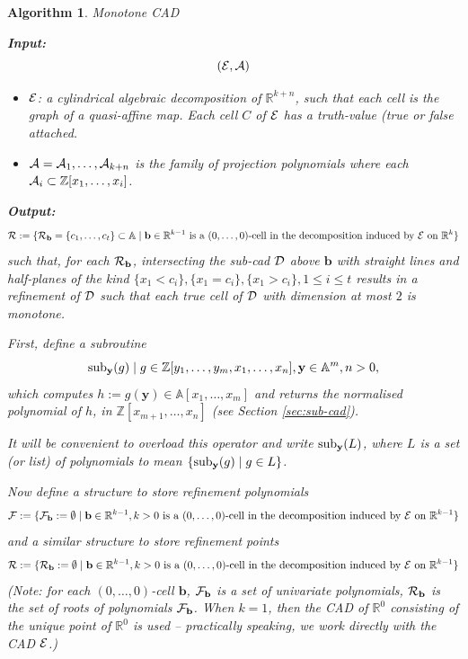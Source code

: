 \documentclass[
]{book}
\newtheorem{algorithm}{Algorithm}
\theoremstyle{definition}
\theoremstyle{definition}
\theoremstyle{definition}
\theoremstyle{definition}
\theoremstyle{remark}
\begin{document}
\begin{algorithm}Monotone CAD

\textbf{Input:}
\[({\cal E}, {\cal A})\]

\begin{itemize}
\item
  \(\cal E\): a cylindrical algebraic decomposition of \(\mathbb{R}^{k+n}\), such that each cell is the graph of a quasi-affine map. Each cell \(C\) of \(\cal E\) has a truth-value (\emph{true} or \emph{false} attached.
\item
  \({\cal A} = {\cal A}_1,\ldots,{\cal A}_{k+n}\) is the family of projection polynomials where each \({\cal A}_i \subset \mathbb{Z}[x_1,\ldots,x_i]\).
\end{itemize}

\textbf{Output:}
\[
{\cal R} := \{ {\cal R}_{\mathbf{b}} = \{ c_1,\ldots,c_t \} \subset \mathbb{A}\mid \mathbf{b} \in \mathbb{R}^{k-1} \text{ is a } (0,\ldots,0) \text{-cell in the decomposition induced by } {\cal E} \text{ on } \mathbb{R}^k \}
\]
such that, for each \({\cal R}_\mathbf{b}\), intersecting the sub-cad \(\cal D\) above \(\mathbf{b}\) with straight lines and half-planes of the kind \(\{x_1 < c_i \}, \{x_1 = c_i \}, \{x_1 > c_i\}, 1 \le i \le t\) results in a refinement of \(\cal D\) such that each true cell of \(\cal D\) with dimension at most \(2\) is monotone.

First, define a subroutine
\[{\rm sub}_{\mathbf{y}} (g) \mid g \in \mathbb{Z}[y_1,\ldots,y_m,x_1,\ldots,x_n], \mathbf{y} \in \mathbb{A}^m, n > 0,\]
which computes \(h := g(\mathbf{y}) \in \mathbb{A}[x_{1},\ldots,x_m]\) and returns the normalised polynomial of \(h\), in \(\mathbb{Z}[x_{m+1},\ldots,x_n]\) (see Section \ref{sec:sub-cad}).

It will be convenient to overload this operator and write \({\rm sub}_{\mathbf{y}} (L)\), where \(L\) is a set (or list) of polynomials to mean \(\{ {\rm sub}_{\mathbf{y}} (g) \mid g \in L \}\).

Now define a structure to store refinement polynomials
\[
{\cal F} := \{ {\cal F}_{\mathbf{b}} := \emptyset \mid \mathbf{b} \in \mathbb{R}^{k-1}, k > 0 \text{ is a } (0,\ldots,0) \text{-cell in the decomposition induced by } {\cal E} \text{ on } \mathbb{R}^{k-1} \}
\]
and a similar structure to store refinement points
\[
{\cal R} := \{ {\cal R}_{\mathbf{b}} := \emptyset \mid \mathbf{b} \in \mathbb{R}^{k-1}, k > 0 \text{ is a } (0,\ldots,0) \text{-cell in the decomposition induced by } {\cal E} \text{ on } \mathbb{R}^{k-1} \}
\]
\emph{(Note: for each \((0,\ldots,0)\)-cell \(\mathbf{b}\), \({\cal F}_\mathbf{b}\) is a set of univariate polynomials, \({\cal R}_{\mathbf{b}}\) is the set of roots of polynomials \({\cal F}_\mathbf{b}\). When \(k=1\), then the CAD of \(\mathbb{R}^0\) consisting of the unique point of \(\mathbb{R}^0\) is used -- practically speaking, we work directly with the CAD \(\cal E\).)}


\end{algorithm}
\end{document}
